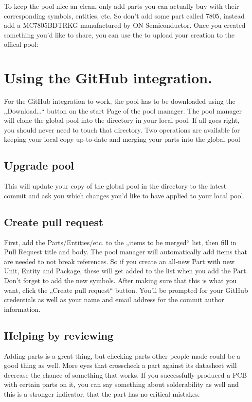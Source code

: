 \documentclass[letterpaper,10pt,czech]{sphinxmanual}
\begin{document}
To keep the pool nice an clean, only add parts you can actually buy with
their corresponding symbols, entities, etc. So don’t add some part
called 7805, instead add a MC7805BDTRKG manufactured by ON
Semiconductor. Once you created something you’d like to share, you can use the
{\hyperref[\detokenize{pool-mgr::doc}]{}} to upload your creation to the offical pool:


\section{Using the GitHub integration.}
\label{\detokenize{pool-contribute:using-the-github-integration}}
For the GitHub integration to work, the pool has to be downloaded using
the „Download…“ button on the start Page of the pool manager. The pool
manager will clone the global pool into the  directory in
your local pool. If all goes right, you should never need to touch that
directory. Two operations are available for keeping your local copy
up-to-date and merging your parts into the global pool


\subsection{Upgrade pool}
\label{\detokenize{pool-contribute:upgrade-pool}}
This will update your copy of the global pool in the 
directory to the latest commit and ask you which changes you’d like to
have applied to your local pool.


\subsection{Create pull request}
\label{\detokenize{pool-contribute:create-pull-request}}
First, add the Parts/Entities/etc. to the „items to be merged“ list,
then fill in Pull Request title and body. The pool manager will
automatically add items that are needed to not break references. So if
you create an all-new Part with new Unit, Entity and Package, these will
get added to the list when you add the Part. Don’t forget to add the new
symbols. After making sure that this is what you want, click the „Create
pull request“ button. You’ll be prompted for your GitHub credentials as
well as your name and email address for the commit author information.


\subsection{Helping by reviewing}
\label{\detokenize{pool-contribute:helping-by-reviewing}}
Adding parts is a great thing, but checking parts other people made could be a
good thing as well. More eyes that crosscheck a part against its datasheet will
decrease the chance of something that works. If you successfully produced a PCB
with certain parts on it, you can say something about solderability as well and
this is a stronger indicator, that the part has no critical mistakes.
\end{document}
